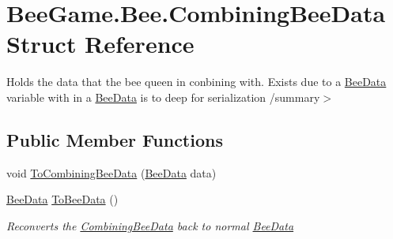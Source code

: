 \hypertarget{struct_bee_game_1_1_bee_1_1_combining_bee_data}{}\section{Bee\+Game.\+Bee.\+Combining\+Bee\+Data Struct Reference}
\label{struct_bee_game_1_1_bee_1_1_combining_bee_data}


Holds the data that the bee queen in conbining with. Exists due to a \hyperlink{struct_bee_game_1_1_bee_1_1_bee_data}{Bee\+Data} variable with in a \hyperlink{struct_bee_game_1_1_bee_1_1_bee_data}{Bee\+Data} is to deep for serialization /summary$>$  


\subsection*{Public Member Functions}
\begin{DoxyCompactItemize}
\item 
void \hyperlink{struct_bee_game_1_1_bee_1_1_combining_bee_data_abdf4646728337da76097aed9b74347ae}{To\+Combining\+Bee\+Data} (\hyperlink{struct_bee_game_1_1_bee_1_1_bee_data}{Bee\+Data} data)
\item 
\hyperlink{struct_bee_game_1_1_bee_1_1_bee_data}{Bee\+Data} \hyperlink{struct_bee_game_1_1_bee_1_1_combining_bee_data_a8f49452b4800bbc401a225e2676eeca0}{To\+Bee\+Data} ()
\begin{DoxyCompactList}\small\item\em Reconverts the \hyperlink{struct_bee_game_1_1_bee_1_1_combining_bee_data}{Combining\+Bee\+Data} back to normal \hyperlink{struct_bee_game_1_1_bee_1_1_bee_data}{Bee\+Data} \end{DoxyCompactList}\end{DoxyCompactItemize}

